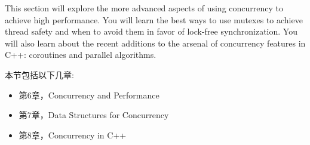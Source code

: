 This section will explore the more advanced aspects of using concurrency to achieve high performance. You will learn the best ways to use mutexes to achieve thread safety and when to avoid them in favor of lock-free synchronization. You will also learn about the recent additions to the arsenal of concurrency features in C++: coroutines and parallel algorithms.

本节包括以下几章:

\begin{itemize}
\item 第6章，Concurrency and Performance
\item 第7章，Data Structures for Concurrency
\item 第8章，Concurrency in C++
\end{itemize}

